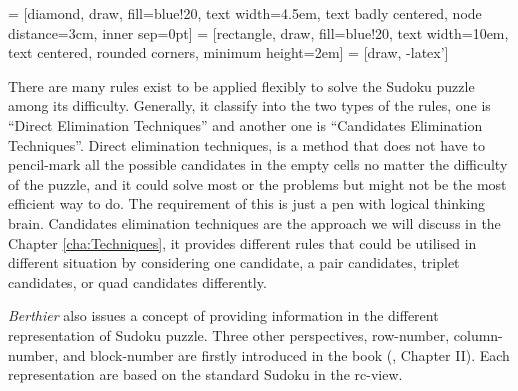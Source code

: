 \documentclass[11pt]{report}
\begin{document}
 = [diamond, draw, fill=blue!20, 
    text width=4.5em, text badly centered, node distance=3cm, inner sep=0pt]
 = [rectangle, draw, fill=blue!20, 
    text width=10em, text centered, rounded corners, minimum height=2em]
 = [draw, -latex']
\begin{center}   
\end{center}

There are many rules exist to be applied flexibly to solve the Sudoku puzzle among its difficulty. Generally, it classify into the two types of the rules, one is ``Direct Elimination Techniques'' and another one is ``Candidates Elimination Techniques''. Direct elimination techniques, is a method that does not have to pencil-mark all the possible candidates in the empty cells no matter the difficulty of the puzzle, and it could solve most or the problems but might not be the most efficient way to do. The requirement of this is just a pen with logical thinking brain. Candidates elimination techniques are the approach we will discuss in the  Chapter \ref{cha:Techniques}, it provides different rules that could be utilised in different situation by considering one candidate, a pair candidates, triplet candidates, or quad candidates differently.

\emph{Berthier} also issues a concept of providing information in the different representation of Sudoku puzzle. Three other perspectives, row-number, column-number, and block-number are firstly introduced in the book (\cite{Berthier2007Sudoku}, Chapter II). Each representation are based on the standard Sudoku in the rc-view.
\end{document}
